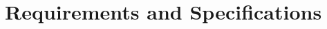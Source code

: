 \documentclass[../Report.tex]{subfiles}
\begin{document}
\chapter{Requirements and  Specifications}
\end{document}

